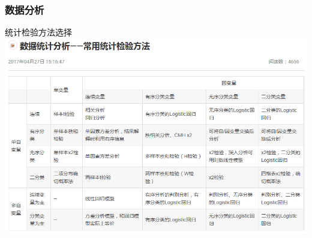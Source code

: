\documentclass[serif]{beamer}
\begin{document}
    \subsubsection{数据分析}
    \begin{frame}{统计检验方法选择}
        \includegraphics[scale=0.47]{statisticaltest.png}
    \end{frame}
\end{document}
